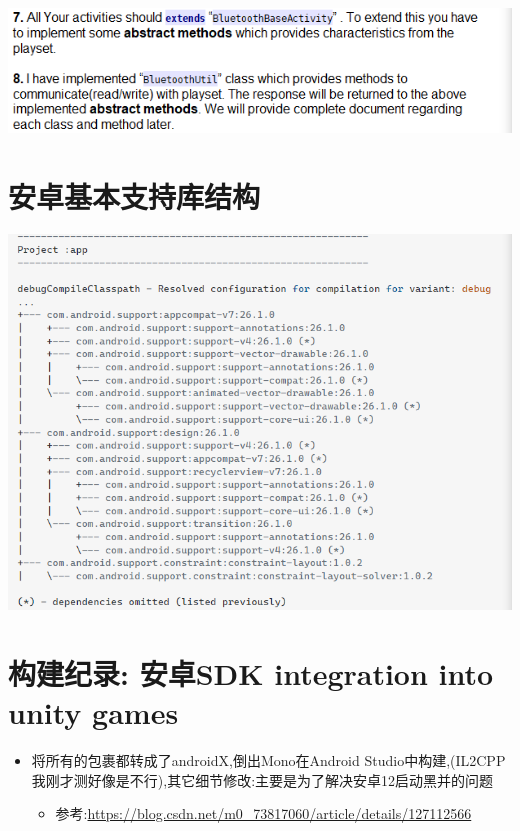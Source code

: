\documentclass[9pt, b5paper]{article}
\begin{document}
\includegraphics[width=.9\linewidth]{./pic/notes_20221220_153542.png}
\section{安卓基本支持库结构}
\label{sec-7}

\includegraphics[width=.9\linewidth]{./pic/notes_20221220_223427.png}

\section{构建纪录: 安卓SDK integration into unity games}
\label{sec-8}
\begin{itemize}
\item 将所有的包裹都转成了androidX,倒出Mono在Android Studio中构建,(IL2CPP我刚才测好像是不行),其它细节修改:主要是为了解决安卓12启动黑并的问题
\begin{itemize}
\item 参考:\url{https://blog.csdn.net/m0_73817060/article/details/127112566}
\end{itemize}
\end{itemize}
\end{document}
